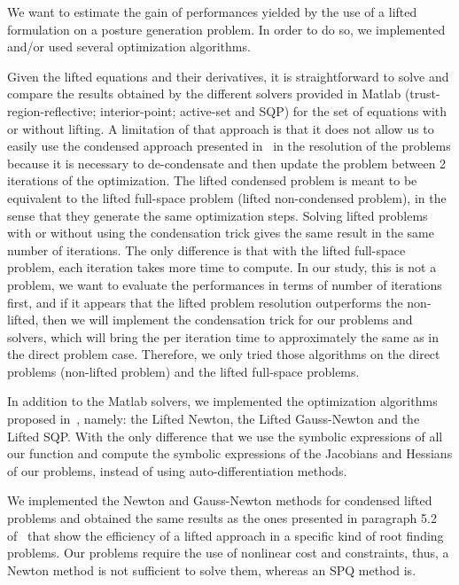 We want to estimate the gain of performances yielded by the use of a lifted formulation on a posture generation problem.
In order to do so, we implemented and/or used several optimization algorithms.

Given the lifted equations and their derivatives, it is straightforward to solve and compare the results obtained by the different solvers provided in Matlab (trust-region-reflective; interior-point; active-set and SQP) for the set of equations with or without lifting.
A limitation of that approach is that it does not allow us to easily use the condensed approach presented in~\cite{Albersmeyer:2010:LNM:1958447.1958472} in the resolution of the problems because it is necessary to de-condensate and then update the problem between 2 iterations of the optimization.
The lifted condensed problem is meant to be equivalent to the lifted full-space problem (lifted non-condensed problem), in the sense that they generate the same optimization steps.
Solving lifted problems with or without using the condensation trick gives the same result in the same number of iterations.
The only difference is that with the lifted full-space problem, each iteration takes more time to compute.
In our study, this is not a problem, we want to evaluate the performances in terms of number of iterations first, and if it appears that the lifted problem resolution outperforms the non-lifted, then we will implement the condensation trick for our problems and solvers, which will bring the per iteration time to approximately the same as in the direct problem case.
Therefore, we only tried those algorithms on the direct problems (non-lifted problem) and the lifted full-space problems.

In addition to the Matlab solvers, we implemented the optimization algorithms proposed in~\cite{Albersmeyer:2010:LNM:1958447.1958472}, namely: the Lifted Newton, the Lifted Gauss-Newton and the Lifted SQP\@.
With the only difference that we use the symbolic expressions of all our function and compute the symbolic expressions of the Jacobians and Hessians of our problems, instead of using auto-differentiation methods.

We implemented the Newton and Gauss-Newton methods for condensed lifted problems and obtained the same results as the ones presented in paragraph 5.2 of~\cite{Albersmeyer:2010:LNM:1958447.1958472} that show the efficiency of a lifted approach in a specific kind of root finding problems.
Our problems require the use of nonlinear cost and constraints, thus, a Newton method is not sufficient to solve them, whereas an SPQ method is.

